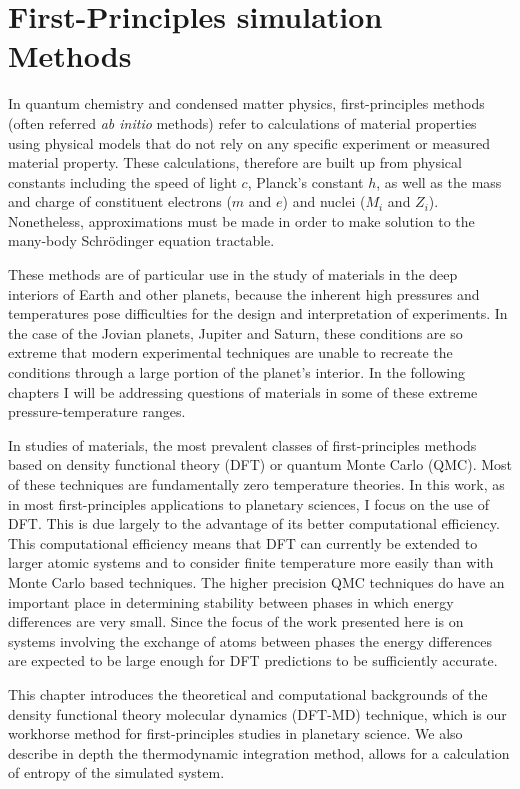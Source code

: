\chapter{First-Principles simulation Methods}\label{chap2}


In quantum chemistry and condensed matter physics, first-principles methods (often
referred \textit{ab initio} methods) refer to calculations of material properties
using physical models that do not rely on any specific experiment or measured
material property. These calculations, therefore are built up from physical constants
including the speed of light $c$, Planck's constant $h$, as well as the mass  and
charge of constituent electrons ($m$ and $e$) and nuclei ($M_i$ and $Z_i$). Nonetheless,
approximations must be made in order to make solution to the many-body Schr\"odinger
equation tractable.

These methods are of particular use in the study of materials in the deep interiors
of Earth and other planets, because the inherent high pressures and temperatures
pose difficulties for the design and interpretation of experiments. In the case of the
Jovian planets, Jupiter and Saturn, these conditions are so extreme that modern
experimental techniques are unable to recreate the conditions through a large portion
of the planet's interior. In the following chapters I will be addressing questions of
materials in some of these extreme pressure-temperature ranges.

In studies of materials, the most prevalent classes of first-principles methods based
on density functional theory (DFT) or quantum Monte Carlo (QMC). Most of these
techniques are fundamentally zero temperature theories. In this work, as in most
first-principles applications to planetary sciences, I focus on the use of DFT. This
is due largely to the advantage of its better computational efficiency. This
computational efficiency means that DFT can currently be extended to larger atomic
systems and to consider finite temperature more easily than with Monte Carlo based
techniques. The higher precision QMC techniques do have an important place in
determining stability between phases in which energy differences are very small.
Since the focus of the work presented here is on systems involving the exchange of
atoms between phases the energy differences are expected to be large enough for DFT
predictions to be sufficiently accurate.

This chapter introduces the theoretical and computational backgrounds of the density
functional theory molecular dynamics (DFT-MD) technique, which is our workhorse
method for first-principles studies in planetary science. We also describe in depth
the thermodynamic integration method, allows for a calculation of entropy of the
simulated system.


